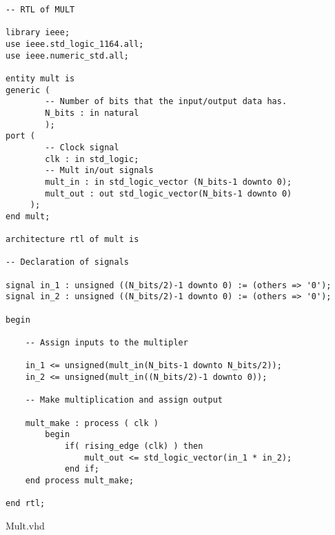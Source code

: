 \begin{code}
\begin{verbatim}
-- RTL of MULT

library ieee;
use ieee.std_logic_1164.all;
use ieee.numeric_std.all;

entity mult is
generic (  
        -- Number of bits that the input/output data has. 
        N_bits : in natural
        );
port (
        -- Clock signal
        clk : in std_logic;
        -- Mult in/out signals
        mult_in : in std_logic_vector (N_bits-1 downto 0);
        mult_out : out std_logic_vector(N_bits-1 downto 0)
     );
end mult;

architecture rtl of mult is

-- Declaration of signals

signal in_1 : unsigned ((N_bits/2)-1 downto 0) := (others => '0');
signal in_2 : unsigned ((N_bits/2)-1 downto 0) := (others => '0');

begin
  
    -- Assign inputs to the multipler 

    in_1 <= unsigned(mult_in(N_bits-1 downto N_bits/2));
    in_2 <= unsigned(mult_in((N_bits/2)-1 downto 0));

    -- Make multiplication and assign output

    mult_make : process ( clk )
        begin
            if( rising_edge (clk) ) then
                mult_out <= std_logic_vector(in_1 * in_2);
            end if;
    end process mult_make;

end rtl;
\end{verbatim}
\caption{Mult.vhd}
\label{ap-cod:1}
\end{code}

